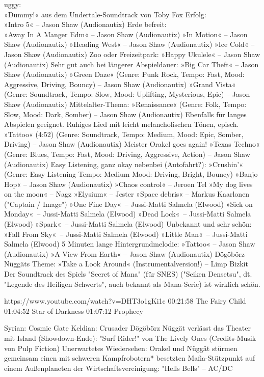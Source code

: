     uggy:\\ »Dummy!« aus dem Undertale-Soundtrack von Toby Fox
    Erfolg:\\ »Intro 5« – Jason Shaw (Audionautix)
    Erde befreit:\\ »Away In A Manger Edm« – Jason Shaw (Audionautix)
    »In Motion« – Jason Shaw (Audionautix)
    »Heading West« – Jason Shaw (Audionautix)
    »Ice Cold« – Jason Shaw (Audionautix)
    Zoo oder Freizeitpark: »Happy Ukulele« – Jason Shaw (Audionautix)
    Sehr gut auch bei längerer Abspieldauer: »Big Car Theft« – Jason Shaw (Audionautix)
    »Green Daze« (Genre: Punk Rock, Tempo: Fast, Mood: Aggressive, Driving, Bouncy) – Jason Shaw (Audionautix)
    »Grand Vista« (Genre: Soundtrack, Tempo: Slow, Mood: Uplifting, Mysterious, Epic) – Jason Shaw (Audionautix)
    Mittelalter-Thema: »Renaissance« (Genre: Folk, Tempo: Slow, Mood: Dark, Somber) – Jason Shaw (Audionautix)
    Ebenfalls für langes Abspielen geeignet. Ruhiges Lied mit leicht melancholischen Tönen, episch. »Tattoo« (4:52) (Genre: Soundtrack, Tempo: Medium, Mood: Epic, Somber, Driving) – Jason Shaw (Audionautix)
    Meister Orakel goes again! »Texas Techno« (Genre: Blues, Tempo: Fast, Mood: Driving, Aggressive, Action) – Jason Shaw (Audionautix)
    Easy Listening, ganz okay nebenbei (Autofahrt?): »Crushin'« (Genre: Easy Listening Tempo: Medium Mood: Driving, Bright, Bouncy)
    »Banjo Hop« – Jason Shaw (Audionautix)
    »Chaos control« – Jeroen Tel
    »My dog lives on the moon« – Nagz
    »Elysium« – Jester
    »Space debris« – Markus Kaarlonen ("Captain / Image")
    »One Fine Day«~– Jussi-Matti Salmela (Elwood)
    »Sick on Monday«~– Jussi-Matti Salmela (Elwood)
    »Dead Lock«~– Jussi-Matti Salmela (Elwood)
    »Spark«~– Jussi-Matti Salmela (Elwood)
    Unbekannt und sehr schön: »Fall From Sky«~– Jussi-Matti Salmela (Elwood)
    »Little Man«~– Jussi-Matti Salmela (Elwood)
    5 Minuten lange Hintergrundmelodie: »Tattoo« – Jason Shaw (Audionautix)
    »A View From Earth« – Jason Shaw (Audionautix)
    Dögöbörz Nüggäts Theme: »Take a Look Around« (Instrumentalversion!) – Limp Bizkit
    Der Soundtrack des Spiels "Secret of Mana" (für SNES) ("Seiken Densetsu", dt. "Legende des Heiligen Schwerts", auch bekannt als Mana-Serie) ist wirklich schön.

        https://www.youtube.com/watch?v=DHT3o1gKi1c
        00:21:58 The Fairy Child
        01:04:52 Star of Darkness
        01:07:12 Prophecy

    Syrian: Cosmic Gate
    Keldian: Crusader
    Dögöbörz Nüggät verlässt das Theater mit Island (Showdown-Ende): "Surf Rider!" von The Lively Ones (Credits-Musik von Pulp Fiction)
    Unerwartetes Wiedersehen: Orakel und Nüggät stürmen gemeinsam einen mit schweren Kampfrobotern* besetzten Mafia-Stützpunkt auf einem Außenplaneten der Wirtschaftsvereinigung: "Hells Bells" – AC/DC

